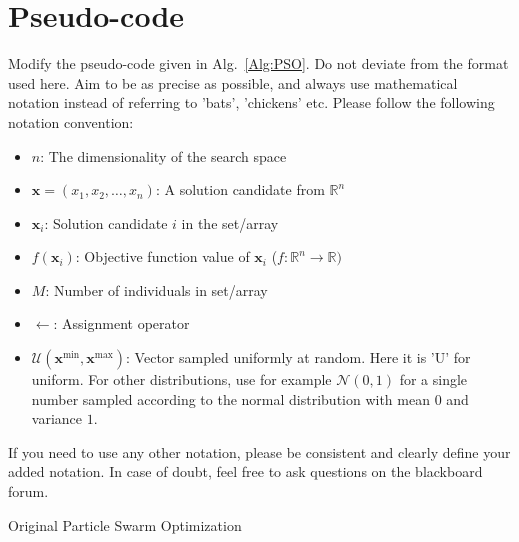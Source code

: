 \documentclass[runningheads]{llncs}
\begin{document}
\section{Pseudo-code}
Modify the pseudo-code given in Alg.~\ref{Alg:PSO}. Do not deviate from the format used here. Aim to be as precise as possible, and always use mathematical notation instead of referring to 'bats', 'chickens' etc. Please follow the following notation convention:
\begin{itemize}
    \item $n$: The dimensionality of the search space
    \item $\mathbf{x}=(x_1,x_2,\dots,x_n)$: A solution candidate from $\mathds{R}^n$
    \item $\mathbf{x}_i$: Solution candidate $i$ in the set/array
    \item $f(\mathbf{x}_i)$: Objective function value of $\mathbf{x}_i$ ($f: \mathds{R}^n \rightarrow \mathds{R})$
    \item $M$: Number of individuals in set/array
    \item $\leftarrow$: Assignment operator
    \item $\bm{\mathcal{U}}(\mathbf{x}^{\text{min}},\mathbf{x}^{\text{max}} )$: Vector sampled uniformly at random. Here it is 'U' for uniform. For other distributions, use for example $\bm{\mathcal{N}}(0,1)$ for a single number sampled according to the normal distribution with mean $0$ and variance $1$. 
\end{itemize}
If you need to use any other notation, please be consistent and clearly define your added notation. In case of doubt, feel free to ask questions on the blackboard forum. 


\vspace{-4mm} 
\begin{algorithm}[!ht]
\begin{algorithmic}[1]
		  
	\EndFor
	
			\EndIf   
				 
			\EndIf  
			   
		\EndFor
	\EndWhile
 \end{algorithmic}
\caption{Original Particle Swarm Optimization}
\label{Alg:PSO}
\end{algorithm}
\vspace{-2mm}




\end{document}
